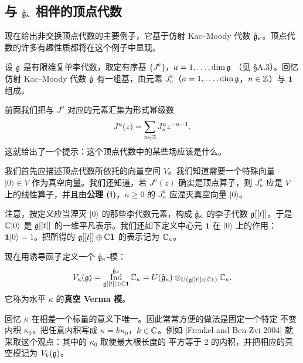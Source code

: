 \subsection{与 $\hat{\mathfrak{g}}_\kappa$ 相伴的顶点代数}

现在给出非交换顶点代数的主要例子，它基于仿射 Kac--Moody 代数
$\hat{\mathfrak{g}}_\kappa$。顶点代数的许多有趣性质都将在这个例子中显现。

设 $\mathfrak{g}$ 是有限维复单李代数，取定有序基 $\{J^a\}$，$a=1,\dots,\dim\mathfrak{g}$
（见 \S A.3）。回忆仿射 Kac--Moody 代数 $\hat{\mathfrak{g}}$ 有一组基，由元素
$J^a_n$（$a=1,\dots,\dim\mathfrak{g}$，$n\in\mathbb{Z}$）与 $\mathbf{1}$ 组成。

前面我们把与 $J^a$ 对应的元素汇集为形式幂级数
\[
    J^a(z)=\sum_{n\in\mathbb{Z}}J^a_nz^{-n-1}.
\]
这就给出了一个提示：这个顶点代数中的某些场应该是什么。

我们首先应描述顶点代数所依托的向量空间 $V$。我们知道需要一个特殊向量
$|0\rangle\in V$ 作为真空向量。我们还知道，若 $J^a(z)$ 确实是顶点算子，则
$J^a_n$ 应是 $V$ 上的线性算子，并且由\textbf{公理 (i)}，$n\ge0$ 的
$J^a_n$ 应湮灭真空向量 $|0\rangle$。

注意，按定义应当湮灭 $|0\rangle$ 的那些李代数元素，构成
$\hat{\mathfrak{g}}_\kappa$ 的李子代数 $\mathfrak{g}[[t]]$。于是 $\mathbb{C}|0\rangle$ 是 $\mathfrak{g}[[t]]$
的一维平凡表示。我们还如下定义中心元 $\mathbf{1}$ 在 $|0\rangle$ 上的作用：
$\mathbf{1}|0\rangle=1$。把所得的 $\mathfrak{g}[[t]]\oplus\mathbb{C}\mathbf{1}$ 的表示记为
$\mathbb{C}_\kappa$。

现在用诱导函子定义一个 $\hat{\mathfrak{g}}_\kappa$-模：
\[
    V_\kappa(\mathfrak{g})=\operatorname*{Ind}_{\mathfrak{g}[[t]]\oplus\mathbb{C}\mathbf{1}}^{\hat{\mathfrak{g}}_\kappa}\mathbb{C}_\kappa
    =U(\hat{\mathfrak{g}}_\kappa)\otimes_{U(\mathfrak{g}[[t]]\oplus\mathbb{C}\mathbf{1})}\mathbb{C}_\kappa.
\]
它称为水平 $\kappa$ 的\textbf{真空 Verma 模}。

回忆 $\kappa$ 在相差一个标量的意义下唯一。因此常常方便的做法是固定一个特定
不变内积 $\kappa_0$，把任意内积写成 $\kappa=k\kappa_0$，$k\in\mathbb{C}$。例如
[Frenkel and Ben-Zvi 2004] 就采取这个观点：其中的 $\kappa_0$ 取使最大根长度的
平方等于 $2$ 的内积，并把相应的真空模记为 $V_k(\mathfrak{g})$。

